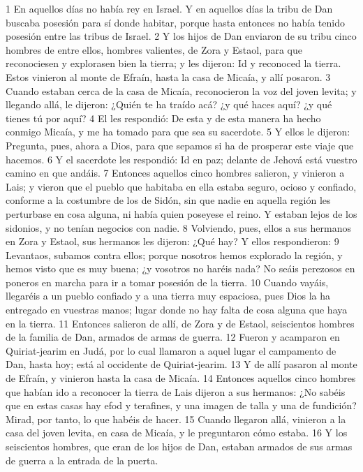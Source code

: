 1 En aquellos días no había rey en Israel. Y en aquellos días la tribu de Dan buscaba posesión para sí donde habitar, porque hasta entonces no había tenido posesión entre las tribus de Israel.
2 Y los hijos de Dan enviaron de su tribu cinco hombres de entre ellos, hombres valientes, de Zora y Estaol, para que reconociesen y explorasen bien la tierra; y les dijeron: Id y reconoced la tierra. Estos vinieron al monte de Efraín, hasta la casa de Micaía, y allí posaron.
3 Cuando estaban cerca de la casa de Micaía, reconocieron la voz del joven levita; y llegando allá, le dijeron: ¿Quién te ha traído acá? ¿y qué haces aquí? ¿y qué tienes tú por aquí?
4 El les respondió: De esta y de esta manera ha hecho conmigo Micaía, y me ha tomado para que sea su sacerdote.
5 Y ellos le dijeron: Pregunta, pues, ahora a Dios, para que sepamos si ha de prosperar este viaje que hacemos.
6 Y el sacerdote les respondió: Id en paz; delante de Jehová está vuestro camino en que andáis.
7 Entonces aquellos cinco hombres salieron, y vinieron a Lais; y vieron que el pueblo que habitaba en ella estaba seguro, ocioso y confiado, conforme a la costumbre de los de Sidón, sin que nadie en aquella región les perturbase en cosa alguna, ni había quien poseyese el reino. Y estaban lejos de los sidonios, y no tenían negocios con nadie.
8 Volviendo, pues, ellos a sus hermanos en Zora y Estaol, sus hermanos les dijeron: ¿Qué hay? Y ellos respondieron:
9 Levantaos, subamos contra ellos; porque nosotros hemos explorado la región, y hemos visto que es muy buena; ¿y vosotros no haréis nada? No seáis perezosos en poneros en marcha para ir a tomar posesión de la tierra.
10 Cuando vayáis, llegaréis a un pueblo confiado y a una tierra muy espaciosa, pues Dios la ha entregado en vuestras manos; lugar donde no hay falta de cosa alguna que haya en la tierra.
11 Entonces salieron de allí, de Zora y de Estaol, seiscientos hombres de la familia de Dan, armados de armas de guerra.
12 Fueron y acamparon en Quiriat-jearim en Judá, por lo cual llamaron a aquel lugar el campamento de Dan, hasta hoy; está al occidente de Quiriat-jearim.
13 Y de allí pasaron al monte de Efraín, y vinieron hasta la casa de Micaía.
14 Entonces aquellos cinco hombres que habían ido a reconocer la tierra de Lais dijeron a sus hermanos: ¿No sabéis que en estas casas hay efod y terafines, y una imagen de talla y una de fundición? Mirad, por tanto, lo que habéis de hacer.
15 Cuando llegaron allá, vinieron a la casa del joven levita, en casa de Micaía, y le preguntaron cómo estaba.
16 Y los seiscientos hombres, que eran de los hijos de Dan, estaban armados de sus armas de guerra a la entrada de la puerta.

